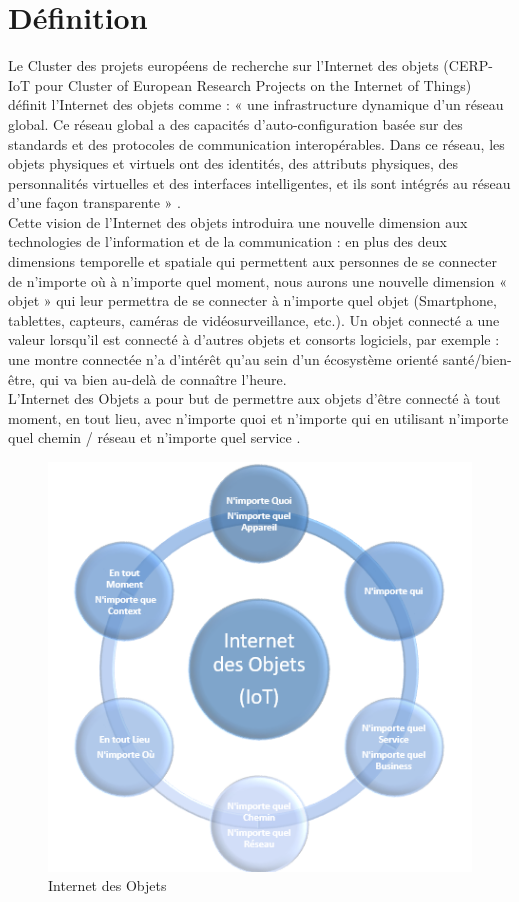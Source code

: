 	\section{Déf{\kern0pt}inition}
	Le Cluster des projets européens de recherche sur l'Internet des objets (CERP-IoT pour Cluster of European Research Projects on the Internet of Things) déf{\kern0pt}init l’Internet des objets comme : « une infrastructure dynamique d’un réseau global. Ce réseau global a des capacités d’auto-conf{\kern0pt}iguration basée sur des standards et des protocoles de communication interopérables. Dans ce réseau, les objets physiques et virtuels ont des identités, des attributs physiques, des personnalités virtuelles et des interfaces intelligentes, et ils sont intégrés au réseau d’une façon transparente » \cite{sundmaeker2010vision}.\\
Cette vision de l’Internet des objets introduira une nouvelle dimension aux technologies de l’information et de la communication : en plus des deux dimensions temporelle et spatiale qui permettent aux personnes de se connecter de n’importe où à n’importe quel moment, nous aurons une nouvelle dimension « objet » qui leur permettra de se connecter à n’importe quel objet \cite{challal2012securite} (Smartphone, tablettes, capteurs, caméras de vidéosurveillance, etc.). Un objet connecté a une valeur lorsqu’il est connecté à d’autres objets et consorts logiciels, par exemple : une montre connectée n’a d’intérêt qu’au sein d’un écosystème orienté santé/bien-être, qui va bien au-delà de connaître l’heure.\\

	L’Internet des Objets a pour but de permettre aux objets d’être connecté à tout moment, en tout lieu, avec n’importe quoi et n’importe qui en utilisant n’importe quel chemin / réseau et n’importe quel service \cite{patel2016iot}.\\
	
	\begin{figure}[H]
		\begin{center}
			\includegraphics{IMAGES/ORIGINALS/Internet_des_Objets}
		\end{center}
		\caption{Internet des Objets}
	\end{figure}

